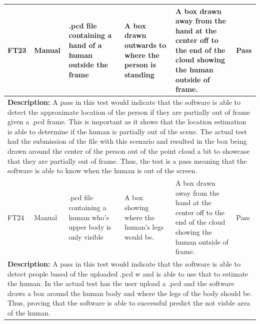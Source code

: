 \documentclass[12pt, titlepage]{article}
\begin{document}
\begin{table}[H]
{\begin{tabular}{|p{2cm}|p{2.5cm}|p{3cm}|p{4cm}|p{4cm}|p{1.8cm}|}
      \hline
      FT23 & Manual & \raggedright .pcd file containing a hand of a human outside the frame \par & \raggedright A box drawn outwards to where the person is standing \par & A box drawn away from the hand at the center off to the end of the cloud showing the human outside of frame. & Pass \\
      \hline
      \multicolumn{6}{|p{\textwidth}|}{\raggedright \textbf{Description:} A pass in this test would indicate that the software is able to detect the approximate location of the person if they are partially out of frame given a .pcd frame. This is important as it shows that the location estimation is able to determine if the human is partially out of the scene. The actual test had the submission of the file with this scenario and resulted in the box being drawn around the center of the person out of the point cloud a bit to showcase that they are partially out of frame. Thus, the test is a pass meaning that the software is able to know when the human is out of the screen. \par} \\
      \hline
      FT24 & Manual & \raggedright .pcd file containing a human who’s upper body is only visible \par & \raggedright A box showing where the human's legs would be. \par & A box drawn away from the hand at the center off to the end of the cloud showing the human outside of frame. & Pass \\
      \hline
      \multicolumn{6}{|p{\textwidth}|}{\raggedright \textbf{Description:} A pass in this test would indicate that the software is able to detect people based of the uploaded .pcd w and is able to use that to estimate the human. In the actual test has the user upload a .pcd and the software draws a box around the human body and where the legs of the body should be. Thus, proving that the software is able to successful predict the not visble area of the human. \par} \\
      \hline
  \end{tabular}
  }
\end{table}
\end{document}
